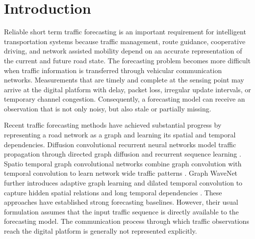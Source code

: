 \documentclass[pdflatex,sn-mathphys-num]{sn-jnl}%
\theoremstyle{thmstyleone}%
\theoremstyle{thmstyletwo}%
\theoremstyle{thmstylethree}%
\begin{document}



\maketitle

\section{Introduction}
\label{sec:introduction}

Reliable short term traffic forecasting is an important requirement for intelligent transportation systems because traffic management, route guidance, cooperative driving, and network assisted mobility depend on an accurate representation of the current and future road state. The forecasting problem becomes more difficult when traffic information is transferred through vehicular communication networks. Measurements that are timely and complete at the sensing point may arrive at the digital platform with delay, packet loss, irregular update intervals, or temporary channel congestion. Consequently, a forecasting model can receive an observation that is not only noisy, but also stale or partially missing.

Recent traffic forecasting methods have achieved substantial progress by representing a road network as a graph and learning its spatial and temporal dependencies. Diffusion convolutional recurrent neural networks model traffic propagation through directed graph diffusion and recurrent sequence learning \cite{li2018dcrnn}. Spatio temporal graph convolutional networks combine graph convolution with temporal convolution to learn network wide traffic patterns \cite{yu2018stgcn}. Graph WaveNet further introduces adaptive graph learning and dilated temporal convolution to capture hidden spatial relations and long temporal dependencies \cite{wu2019graphwavenet}. These approaches have established strong forecasting baselines. However, their usual formulation assumes that the input traffic sequence is directly available to the forecasting model. The communication process through which traffic observations reach the digital platform is generally not represented explicitly.
\end{document}
